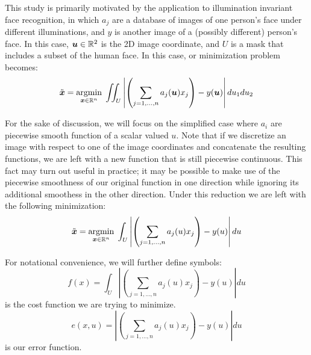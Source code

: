 \documentclass[12pt,journal,draftcls,letterpaper,onecolumn]{IEEEtran}
\begin{document}
This study is primarily motivated by the application to illumination invariant face recognition, in which $a_j$ are a database of images of one person's face under different illuminations, and $y$ is another image of a (possibly different) person's face.  In this case, $\boldsymbol{u} \in \mathbb R^2$ is the 2D image coordinate, and $U$ is a mask that includes a subset of the human face.  In this case, or minimization problem becomes:
\begin{equation}\label{eqn:continuous2D}
\tilde{{\boldsymbol{x}}} = {\hbox{$\underset{{\boldsymbol{x}}\in \mathbb R^n}{\mbox{argmin}}\;$}} \iint_U{\left|\left(\sum_{j=1,\ldots,n} a_j(\boldsymbol{u}) x_j\right) - y(\boldsymbol{u})\right| du_1 du_2}
\end{equation}


For the sake of discussion, we will focus on the simplified case where $a_i$ are piecewise smooth function of a scalar valued $u$.  Note that if we discretize an image with respect to one of the image coordinates and concatenate the resulting functions, we are left with a new function that is still piecewise continuous.  This fact may turn out useful in practice; it may be possible to make use of the piecewise smoothness of our original function in one direction while ignoring its additional smoothess in the other direction.  Under this reduction we are left with the following minimization:
\begin{equation}\label{eqn:continuous1D}
\tilde{{\boldsymbol{x}}} = {\hbox{$\underset{{\boldsymbol{x}}\in \mathbb R^n}{\mbox{argmin}}\;$}} \int_U{ \left|\left(\sum_{j=1,\ldots,n} a_j(u) x_j\right) - y(u)\right| du}
\end{equation}

For notational convenience, we will further define symbols:
\begin{equation}
 f(x) = \int_U{ \left|\left(\sum_{j=1,\ldots,n} a_j(u) x_j\right) - y(u)\right| du}
\end{equation}
is the cost function we are trying to minimize.
\begin{equation}
 e(x,u) = \left|\left(\sum_{j=1,\ldots,n} a_j(u) x_j\right) - y(u)\right| du
\end{equation}
is our error function.
\end{document}
